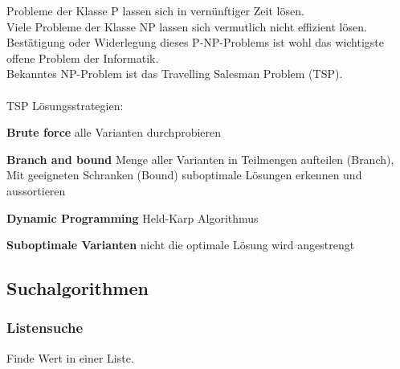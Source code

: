 Probleme der Klasse P lassen sich in vernünftiger Zeit lösen. \\
Viele Probleme der Klasse NP lassen sich vermutlich nicht effizient lösen.\\
Bestätigung oder Widerlegung dieses P-NP-Problems ist wohl das wichtigste offene Problem der Informatik.\\
Bekanntes NP-Problem ist das Travelling Salesman Problem (TSP).\\
\\ 
TSP Lösungsstrategien:
\begin{compactitem}
    \item \textbf{Brute force} alle Varianten durchprobieren
    \item \textbf{Branch and bound} Menge aller Varianten in Teilmengen aufteilen (Branch), Mit geeigneten Schranken (Bound) suboptimale Lösungen erkennen und aussortieren 
    \item \textbf{Dynamic Programming} Held-Karp Algorithmus
    \item \textbf{Suboptimale Varianten} nicht die optimale Lösung wird angestrengt
\end{compactitem}

\subsection{Suchalgorithmen}
\subsubsection{Listensuche}
Finde Wert in einer Liste.\\

